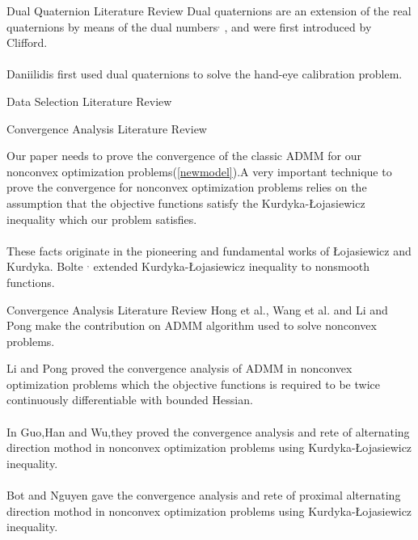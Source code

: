 \documentclass[10pt,cjk]{beamer}
\begin{document}
	\begin{frame}{Dual Quaternion Literature Review}
		Dual quaternions are an extension of the real quaternions by means of the dual numbers$^{,}$ , and were first introduced by Clifford.
		\\ \hspace*{\fill} \\ 
		Daniilidis first used dual quaternions to solve the hand-eye calibration problem.
	\end{frame}
	
	\begin{frame}{Data Selection Literature Review}
		
		
	\end{frame}
	
	
	\begin{frame}{Convergence Analysis Literature Review}
		
		Our paper needs to prove the convergence of the classic ADMM for our nonconvex optimization problems(\ref{newmodel}).A very important technique to prove the convergence for nonconvex optimization problems relies on the assumption that the objective functions satisfy the Kurdyka-Łojasiewicz inequality which our problem satisfies. 
		\\ \hspace*{\fill} \\ 
		
		These facts originate in the pioneering and fundamental works of Łojasiewicz and Kurdyka.
		Bolte	$^{,}$ extended Kurdyka-Łojasiewicz inequality to nonsmooth functions.
	\end{frame}
	
	\begin{frame}{Convergence Analysis Literature Review}
		Hong et al., Wang et al. and Li and Pong make the contribution on 
		ADMM algorithm used to solve nonconvex problems.
		
		
		Li and Pong proved the convergence analysis of ADMM  in nonconvex optimization problems which the objective functions is
		required to be twice continuously differentiable with bounded Hessian.
		\\ \hspace*{\fill} \\ 
		In Guo,Han and Wu,they proved the convergence analysis and rete of alternating direction mothod in nonconvex optimization problems using Kurdyka-Łojasiewicz inequality.
		\\ \hspace*{\fill} \\ 
		Bot and Nguyen gave the convergence analysis and rete of proximal alternating direction mothod in nonconvex optimization problems using Kurdyka-Łojasiewicz inequality.
	\end{frame}
	
\end{document}
